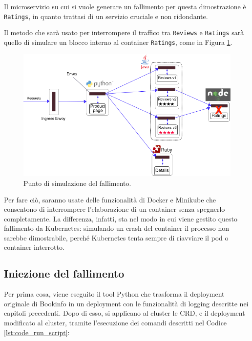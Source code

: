 Il microservizio su cui si vuole generare un fallimento per questa dimostrazione è \texttt{Ratings}, in quanto trattasi di un servizio cruciale e non ridondante.


Il metodo che sarà usato per interrompere il traffico tra \texttt{Reviews} e \texttt{Ratings} sarà quello di simulare un blocco interno al container \texttt{Ratings}, come in Figura \ref{fig:with_istio_broken}.

\begin{figure}[h]
    \centering
    \includegraphics[width=\textwidth]{immagini/capitolo5/withistio_broken.png}
    \caption{Punto di simulazione del fallimento.}
    \label{fig:with_istio_broken}
\end{figure}


Per fare ciò, saranno usate delle funzionalità di Docker e Minikube che consentono di interrompere l'elaborazione di un container senza spegnerlo completamente. La differenza, infatti, sta nel modo in cui viene gestito questo fallimento da Kubernetes: simulando un crash del container il processo non sarebbe dimostrabile, perché Kubernetes tenta sempre di riavviare il pod o container interrotto.
\subsection{Iniezione del fallimento}\label{Iniezione del fallimento}
Per prima cosa, viene eseguito il tool Python che trasforma il deployment originale di Bookinfo in un deployment con le funzionalità di logging descritte nei capitoli precedenti. Dopo di esso, si applicano al cluster le CRD, e il deployment modificato al cluster, tramite l'esecuzione dei comandi descritti nel Codice \ref{lst:code_run_script}:

